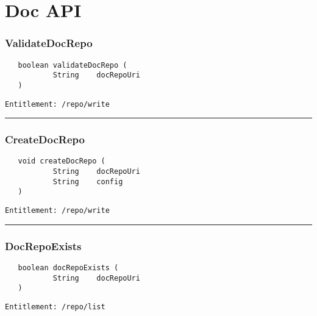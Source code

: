 \chapter{Doc API}

\subsection{ValidateDocRepo}
\label{Api:ValidateDocRepo}
\begin{verbatim}
   boolean validateDocRepo (
           String    docRepoUri
   )
\end{verbatim}
\begin{Verbatim}[fontsize=\small, formatcom=\color{Maroon}]
  Entitlement: /repo/write
\end{Verbatim}



\rule{12cm}{2pt}
\subsection{CreateDocRepo}
\label{Api:CreateDocRepo}
\begin{verbatim}
   void createDocRepo (
           String    docRepoUri
           String    config
   )
\end{verbatim}
\begin{Verbatim}[fontsize=\small, formatcom=\color{Maroon}]
  Entitlement: /repo/write
\end{Verbatim}



\rule{12cm}{2pt}
\subsection{DocRepoExists}
\label{Api:DocRepoExists}
\begin{verbatim}
   boolean docRepoExists (
           String    docRepoUri
   )
\end{verbatim}
\begin{Verbatim}[fontsize=\small, formatcom=\color{Maroon}]
  Entitlement: /repo/list
\end{Verbatim}



